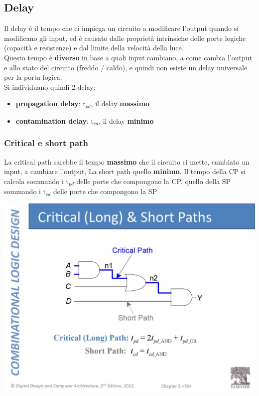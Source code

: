 \documentclass{report}
\begin{document}
    \subsection{Delay}
        Il delay è il tempo che ci impiega un circuito a modificare l'output quando
        si modificano gli input, ed è causato dalle proprietà intrinsiche delle porte logiche (capacità e resistenze) e 
        dal limite della velocità della luce. \\
        Questo tempo è \textbf{diverso} in base a quali input cambiano, a come cambia l'output e 
        allo stato del circuito (freddo / caldo), e quindi non esiste un delay universale per la porta logica. \\
        Si individuano quindi 2 delay:
        \begin{itemize}
            \item \textbf{propagation delay}: t$_{pd}$, il delay \textbf{massimo}
            \item \textbf{contamination delay}: t$_{cd}$, il delay \textbf{minimo}
        \end{itemize}
        \subsubsection{Critical e short path}
            La critical path sarebbe il tempo \textbf{massimo} che il circuito ci mette, cambiato 
            un input, a cambiare l'output, La short path quello \textbf{minimo}.
            Il tempo della CP si calcola sommando i t$_{pd}$ delle porte che compongono la CP,
            quello della SP sommando i t$_{cd}$ delle porte che compongono la SP
            \begin{center}
                \includegraphics[width=\textwidth]{path.jpg}
            \end{center}
\newpage
\end{document}
